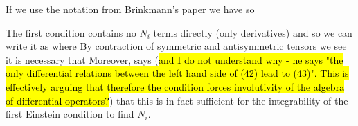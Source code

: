 \documentclass{article}
\begin{document}
\begin{remark}
	If we use the notation from Brinkmann's paper \cite{Brinkmann1925} we have 
so 
\end{remark}

The first condition contains no $N_i$ terms directly (only derivatives) and so we can write it as
where 
By contraction of symmetric and antisymmetric tensors we see it is necessary that 
Moreover, \cite{Brinkmann1925} says (\hl{and I do not understand why - he says "the only differential relations between the left hand side of (42) lead to (43)". This is effectively arguing that therefore the condition forces involutivity of the algebra of differential operators?}) that this is in fact sufficient for the integrability of the first Einstein condition to find $N_i$. 
\end{document}
